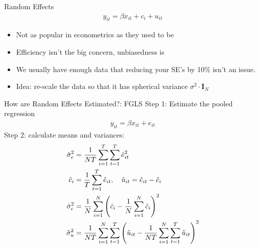\documentclass[aspectratio=169]{beamer}
\begin{document}
\begin{frame}{Random Effects}
\begin{align*}
y_{it} = \beta x_{it} + c_i + u_{it}
\end{align*}
\begin{itemize}
    \item Not as popular in econometrics as they used to be
    \item \alert{Efficiency} isn't the big concern, \alert{unbiasedness} is
    \item We usually have enough data that reducing your SE's by 10\% isn't an issue. 
    \item Idea: re-scale the data so that it has \alert{spherical variance} $\sigma^2 \cdot \mathbf{I}_N$
\end{itemize}
\end{frame}


\begin{frame}{How are Random Effects Estimated?: FGLS}
Step 1: Estimate the \alert{pooled regression}
\begin{align*}
y_{it} = \beta x_{it} + e_{it}
\end{align*}
Step 2: calculate means and variances:
\begin{align*}
\footnotesize
\hat { \sigma } _ { e } ^ { 2 } &= \frac { 1 } { N T } \sum _ { i = 1 } ^ { T } \sum _ { t = 1 } ^ { T } \hat { e } _ { i t } ^ { 2 }\\
\hat { c } _ { i } &= \frac { 1 } { T } \sum _ { t = 1 } ^ { T } \hat { e } _ { i t } , \quad \hat { u } _ { i t } = \hat { e } _ { i t } - \hat {c } _ { i }\\
\hat { \sigma } _ { c } ^ { 2 } &= \frac { 1 } { N } \sum _ { i = 1 } ^ { N } \left( \hat { c } _ { i } - \frac { 1 } { N } \sum _ { i = 1 } ^ { N } \hat { c } _ { i } \right) ^ { 2 }\\
\hat { \sigma } _ { u } ^ { 2 } &= \frac { 1 } { N T } \sum _ { i = 1 } ^ { N } \sum _ { t = 1 } ^ { T } \left( \hat { u } _ { i t } - \frac { 1 } { N T } \sum _ { i = 1 } ^ { N } \sum _ { t = 1 } ^ { T } \hat { u } _ { i t } \right) ^ { 2 }
\end{align*}
\end{frame}
\end{document}
